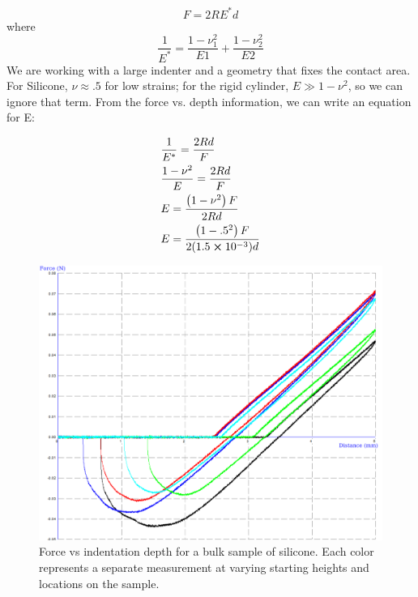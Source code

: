 \begin{equation}
F=2RE^*d
\end{equation}
where 
\begin{equation*}
\frac{1}{E^*} = \frac{1-\nu_1^2}{E1} + \frac{1-\nu_2^2}{E2}
\end{equation*}
We are working with a large indenter and a geometry that fixes the contact area. For Silicone, $ \nu \approx .5$ for low strains; for the rigid cylinder, $ E \gg 1-\nu^2 $, so we can ignore that term. From the force vs. depth information, we can write an equation for E:

\begin{align}
&\frac{1}{E^*} = \frac{2Rd}{F} \\
&\frac{1 -\nu^2}{E} = \frac{2Rd}{F} \\
&E = \frac{\left( 1-\nu^2 \right) F}{2Rd} \\
&E = \frac{\left( 1-.5^2 \right) F}{2(1.5 \cross 10^{-3})d}
\end{align}

\begin{figure}[h!]
	\centering
	\includegraphics[width=.8\linewidth]{Chapters/Figures/190406_DC_1-1RT1-5.png}
	\caption[Bulk Modulus Test]{Force vs indentation depth for a bulk sample of silicone. Each color represents a separate measurement at varying starting heights and locations on the sample.}
	\label{fig:Bulkstiffness_raw}
\end{figure}

